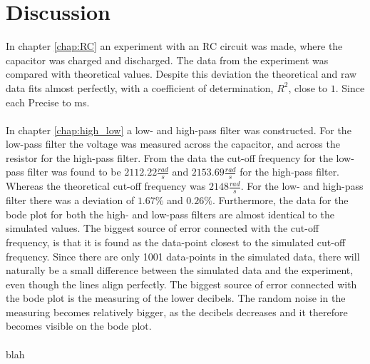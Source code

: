\chapter{Discussion}
In chapter \ref{chap:RC} an experiment with an RC circuit was made, where the capacitor was charged and discharged. The data from the experiment was compared with theoretical values. Despite this deviation the theoretical and raw data fits almost perfectly, with a coefficient of determination, $R^2$, close to $1$. Since each 
Precise to ms.
\\ \\
In chapter \ref{chap:high_low} a low- and high-pass filter was constructed. For the low-pass filter the voltage was measured across the capacitor, and across the resistor for the high-pass filter. From the data the cut-off frequency for the low-pass filter was found to be $2112.22 \frac{rad}{s}$ and $2153.69 \frac{rad}{s}$ for the high-pass filter. Whereas the theoretical cut-off frequency was $2148 \frac{rad}{s}$. For the low- and high-pass filter there was a deviation of $1.67 \% $ and $0.26 \% $. Furthermore, the data for the bode plot for both the high- and low-pass filters are almost identical to the simulated values. The biggest source of error connected with the cut-off frequency, is that it is found as the data-point closest to the simulated cut-off frequency. Since there are only 1001 data-points in the simulated data, there will naturally be a small difference between the simulated data and the experiment, even though the lines align perfectly. The biggest source of error connected with the bode plot is the measuring of the lower decibels. The random noise in the measuring becomes relatively bigger, as the decibels decreases and it therefore becomes visible on the bode plot.
\\ \\
blah